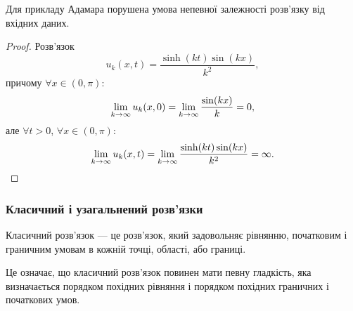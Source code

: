 \begin{proposition}
    Для прикладу Адамара порушена умова непевної залежності роз\-в'яз\-ку від вхідних даних.
\end{proposition}

\begin{proof}
    Розв'язок
    \begin{equation}
        u_k(x, t) = \frac{\sinh(k t) \sin (k x)}{k^2},
    \end{equation}
    причому $\forall x \in (0, \pi)$:
    \begin{equation}
        \displaystyle\lim\limits_{k \to \infty} u_k(x, 0) =  \displaystyle\lim\limits_{k \to \infty} \frac{\sin (k x)}{k} = 0,
    \end{equation}
    але $\forall t > 0$, $\forall x \in (0, \pi)$:
    \begin{equation}
        \displaystyle\lim\limits_{k \to \infty} u_k(x, t) =  \displaystyle\lim\limits_{k \to \infty} \frac{\sinh(k t) \sin (k x)}{k^2} = \infty.
    \end{equation}
\end{proof}

\subsubsection{Класичний і узагальнений розв'язки}

\begin{definition}
    Класичний розв'язок --- це розв'язок, який задовольняє рівнянню, початковим і граничним умовам в кожній точці, області, або границі.    
\end{definition}

Це означає, що класичний розв'язок повинен мати певну гладкість, яка визначається порядком похідних рівняння і порядком похідних граничних і початкових умов.

\newpage 

